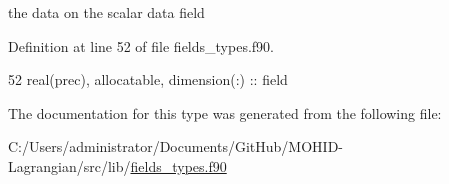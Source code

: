 the data on the scalar data field 



Definition at line 52 of file fields\+\_\+types.\+f90.


\begin{DoxyCode}
52         \textcolor{keywordtype}{real(prec)}, \textcolor{keywordtype}{allocatable}, \textcolor{keywordtype}{dimension(:)} :: field
\end{DoxyCode}


The documentation for this type was generated from the following file\+:\begin{DoxyCompactItemize}
\item 
C\+:/\+Users/administrator/\+Documents/\+Git\+Hub/\+M\+O\+H\+I\+D-\/\+Lagrangian/src/lib/\mbox{\hyperlink{fields__types_8f90}{fields\+\_\+types.\+f90}}\end{DoxyCompactItemize}
